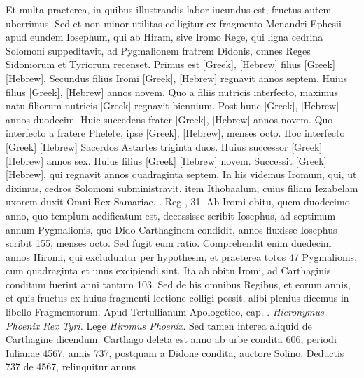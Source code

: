 Et
multa praeterea, in quibus illustrandis labor iucundus est, fructus
autem uberrimus.
Sed et non minor utilitas colligitur ex fragmento
Menandri Ephesii apud eundem Iosephum, qui ab Hiram, sive
Iromo Rege, qui ligna cedrina Solomoni suppeditavit, ad Pygmalionem
fratrem Didonis, omnes Reges Sidoniorum et Tyriorum
recenset.
Primus est \textgreek{[Greek]}, \texthebrew{[Hebrew]}
 filius \textgreek{[Greek]} \texthebrew{[Hebrew]}.
Secundus filius Iromi \textgreek{[Greek]}, \texthebrew{[Hebrew]}
 regnavit annos septem.
Huius filius \textgreek{[Greek]}, \texthebrew{[Hebrew]} annos novem.
Quo a filiis nutricis
interfecto, maximus natu filiorum nutricis \textgreek{[Greek]} regnavit
biennium.
Post hunc \textgreek{[Greek]}, \texthebrew{[Hebrew]} annos
duodecim.
Huic succedens frater \textgreek{[Greek]},
 \texthebrew{[Hebrew]} annos novem.
Quo interfecto a fratere Phelete, ipse
 \textgreek{[Greek]}, \texthebrew{[Hebrew]}, menses octo.
Hoc interfecto \textgreek{[Greek]} \texthebrew{[Hebrew]}
 Sacerdos Astartes triginta
duos.
Huius successor \textgreek{[Greek]} \texthebrew{[Hebrew]} annos sex.
Huius filius
\textgreek{[Greek]} \texthebrew{[Hebrew]} novem.
Successit \textgreek{[Greek]} \texthebrew{[Hebrew]}, qui regnavit
annos quadraginta septem.
In his videmus Iromum, qui, ut
diximus, cedros Solomoni subministravit, item Ithobaalum, cuius
filiam Iezabelam uxorem duxit Omni Rex Samariae. . Reg ,
31.
Ab Iromi obitu, quem duodecimo anno, quo templum aedificatum
est, decessisse scribit Iosephus, ad septimum annum Pygmalionis,
quo Dido Carthaginem condidit, annos fluxisse Iosephus
scribit 155, menses octo.
Sed fugit eum ratio.
Comprehendit
enim duedecim annos Hiromi, qui excluduntur per hypothesin,
et praeterea totos 47 Pygmalionis, cum quadraginta et
unus excipiendi sint.
Ita ab obitu Iromi, ad Carthaginis conditum
fuerint anni tantum 103.
Sed de his omnibus Regibus, et
eorum annis, et quis fructus ex huius fragmenti lectione colligi
possit, alibi plenius dicemus in libello Fragmentorum.
Apud Tertullianum Apologetico, cap. .
\textit{Hieronymus Phoenix Rex Tyri.}
Lege \textit{Hiromus Phoenix}.
Sed tamen interea aliquid de Carthagine
dicendum.
Carthago deleta est anno ab urbe condita 606,
periodi Iulianae 4567, annis 737, postquam a Didone condita,
auctore Solino.
Deductis 737 de 4567, relinquitur annus
